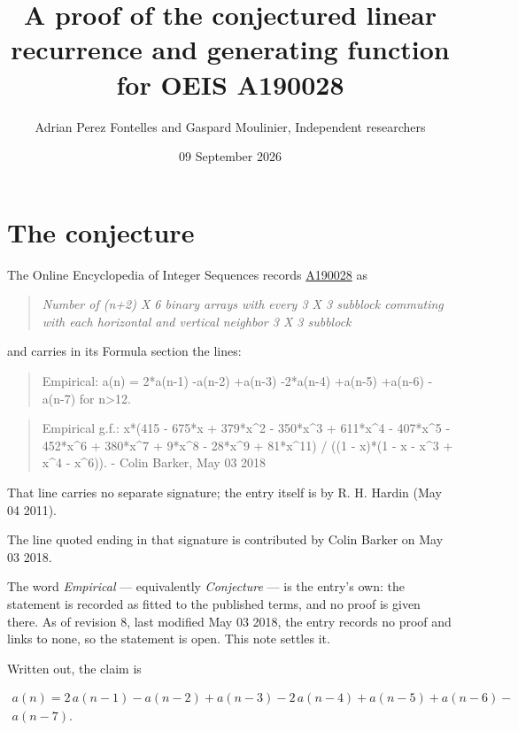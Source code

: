 \documentclass[11pt]{article}
\title{A proof of the conjectured linear recurrence and generating function for OEIS A190028}
\author{Adrian Perez Fontelles and Gaspard Moulinier, Independent researchers}
\date{09 September 2026}
\theoremstyle{definition}
\begin{document}
\maketitle
\section{The conjecture}

The Online Encyclopedia of Integer Sequences records \href{https://oeis.org/A190028}{A190028} as

\begin{quote}\itshape Number of (n+2) X 6 binary arrays with every 3 X 3 subblock commuting with each horizontal and vertical neighbor 3 X 3 subblock\end{quote}

and carries in its Formula section the lines:

\begin{quote}\ttfamily Empirical: a(n) = 2*a(n-1) -a(n-2) +a(n-3) -2*a(n-4) +a(n-5) +a(n-6) -a(n-7) for n>12.\end{quote}

\begin{quote}\ttfamily Empirical g.f.: x*(415 - 675*x + 379*x\textasciicircum{}2 - 350*x\textasciicircum{}3 + 611*x\textasciicircum{}4 - 407*x\textasciicircum{}5 - 452*x\textasciicircum{}6 + 380*x\textasciicircum{}7 + 9*x\textasciicircum{}8 - 28*x\textasciicircum{}9 + 81*x\textasciicircum{}11) / ((1 - x)*(1 - x - x\textasciicircum{}3 + x\textasciicircum{}4 - x\textasciicircum{}6)). - Colin Barker, May 03 2018\end{quote}

That line carries no separate signature; the entry itself is by R. H. Hardin (May 04 2011).

The line quoted ending in that signature is contributed by Colin Barker on May 03 2018.

The word {\itshape Empirical} --- equivalently {\itshape Conjecture} --- is the entry's own: the statement is recorded as fitted to the published terms, and no proof is given there. As of revision 8, last modified May 03 2018, the entry records no proof and links to none, so the statement is open. This note settles it.

Written out, the claim is

\begin{multline*} a(n) = 2\,a(n-1) - a(n-2) + a(n-3) - 2\,a(n-4) + a(n-5) + a(n-6) - \\ a(n-7). \end{multline*}
\end{document}

